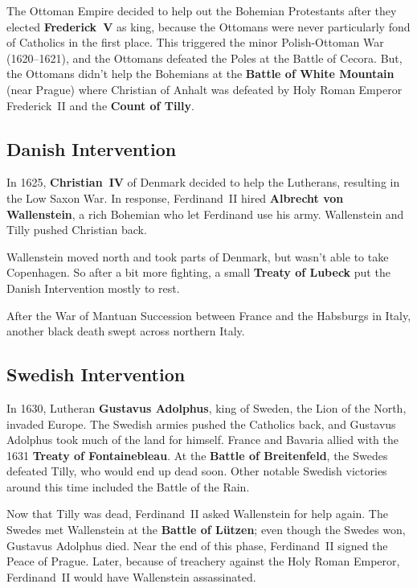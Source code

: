 The Ottoman Empire decided to help out the Bohemian Protestants after they elected \textbf{Frederick~V} as king,
because the Ottomans were never particularly fond of Catholics in the first place.
This triggered the minor Polish-Ottoman War (1620--1621),
and the Ottomans defeated the Poles at the Battle of Cecora.
But, the Ottomans didn't help the Bohemians at the \textbf{Battle of White Mountain} (near Prague)
where Christian of Anhalt was defeated by Holy Roman Emperor Frederick~II and the \textbf{Count of Tilly}.

\subsection*{Danish Intervention}

In 1625, \textbf{Christian~IV} of Denmark decided to help the Lutherans, resulting in the Low Saxon War.
In response, Ferdinand~II hired \textbf{Albrecht von Wallenstein},
a rich Bohemian who let Ferdinand use his army.
Wallenstein and Tilly pushed Christian back.

Wallenstein moved north and took parts of Denmark, but wasn't able to take Copenhagen.
So after a bit more fighting, a small \textbf{Treaty of Lubeck} put the Danish Intervention mostly to rest.

After the War of Mantuan Succession between France and the Habsburgs in Italy,
another black death swept across northern Italy.

\subsection*{Swedish Intervention}

In 1630, Lutheran \textbf{Gustavus Adolphus}, king of Sweden, the Lion of the North, invaded Europe.
The Swedish armies pushed the Catholics back, and Gustavus Adolphus took much of the land for himself.
France and Bavaria allied with the 1631 \textbf{Treaty of Fontainebleau}.
At the \textbf{Battle of Breitenfeld}, the Swedes defeated Tilly, who would end up dead soon.
Other notable Swedish victories around this time included the Battle of the Rain.

Now that Tilly was dead, Ferdinand~II asked Wallenstein for help again.
The Swedes met Wallenstein at the \textbf{Battle of L\"utzen};
even though the Swedes won, Gustavus Adolphus died.
Near the end of this phase, Ferdinand~II signed the Peace of Prague.
Later, because of treachery against the Holy Roman Emperor, Ferdinand~II would have Wallenstein assassinated.

